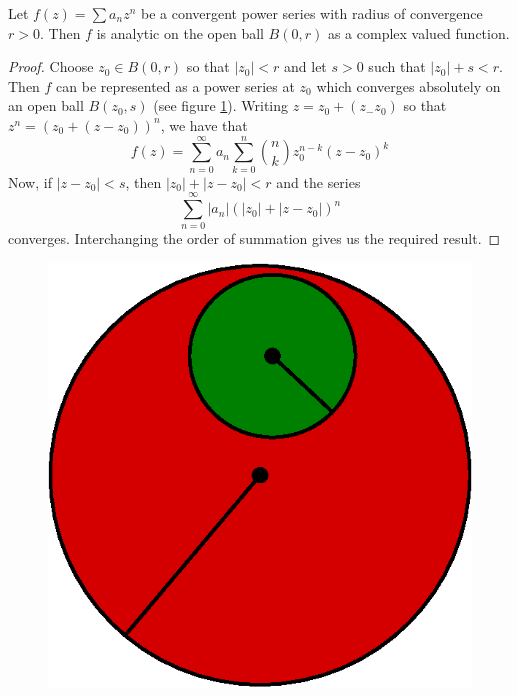 \begin{theorem}\label{2.4.3}
    Let $f(z)=\sum{a_nz^n}$ be a convergent power series with radius of
    convergence $r>0$. Then  $f$ is analytic on the open ball $B(0,r)$ as a
    complex valued function.
\end{theorem}
\begin{proof}
    Choose $z_0 \in B(0,r)$ so that $|z_0|<r$ and let $s>0$ such that
    $|z_0|+s<r$. Then $f$ can be represented as a power series at $z_0$ which
    converges absolutely on an open ball $B(z_0,s)$ (see figure \ref{figure_2.1}).
    Writing $z=z_0+(z_-z_0)$ so that $z^n=(z_0+(z-z_0))^n$, we have that
    \begin{equation*}
        f(z)=\sum_{n=0}^\infty{a_n\sum_{k=0}^n{{n \choose k}z_0^{n-k}(z-z_0)^k}}
    \end{equation*}
    Now, if $|z-z_0|<s$, then $|z_0|+|z-z_0|<r$ and the series
    \begin{equation*}
        \sum_{n=0}^\infty{|a_n|(|z_0|+|z-z_0|)^n}
    \end{equation*}
    converges. Interchanging the order of summation gives us the required
    result.
\end{proof}

\begin{figure}[h]
    \centering
    \includegraphics[scale=0.5]{Figures/Chapter2/analytic_ball.eps}
    \caption{}
    \label{figure_2.1}
\end{figure}

